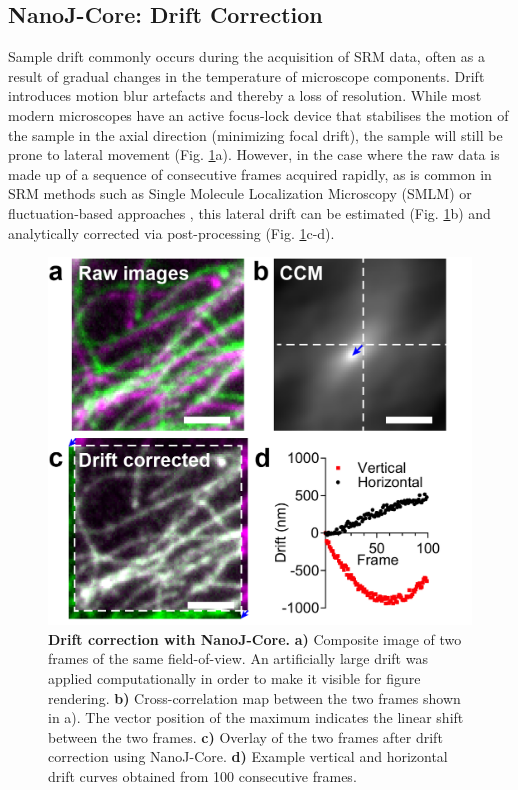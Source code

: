 \subsection*{NanoJ-Core: Drift Correction}
Sample drift commonly occurs during the acquisition of SRM data, often as a result of gradual changes in the temperature of microscope components. Drift introduces motion blur artefacts and thereby a loss of resolution. While most modern microscopes have an active focus-lock device that stabilises the motion of the sample in the axial direction (minimizing focal drift), the sample will still be prone to lateral movement (Fig. \ref{fig:DriftCorrection}a). However, in the case where the raw data is made up of a sequence of consecutive frames acquired rapidly, as is common in SRM methods such as Single Molecule Localization Microscopy (SMLM) \cite{betzig2006imaging,rust2006sub} or fluctuation-based approaches \cite{gustafsson2016fast,dertinger2009fast,cox2012bayesian}, this lateral drift can be estimated (Fig. \ref{fig:DriftCorrection}b) and analytically corrected via post-processing (Fig. \ref{fig:DriftCorrection}c-d).
 
 \begin{figure}[!t]
    \centering
    \includegraphics{Figures/FigureDrift_v2.png}
    \caption{\textbf{Drift correction with NanoJ-Core.} \textbf{a)} Composite image of two frames of the same field-of-view. An artificially large drift was applied computationally in order to make it visible for figure rendering. \textbf{b)} Cross-correlation map between the two frames shown in a). The vector position of the maximum indicates the linear shift between the two frames. \textbf{c)} Overlay of the two frames after drift correction using NanoJ-Core. \textbf{d)} Example vertical and horizontal drift curves obtained from 100 consecutive frames.}
    \label{fig:DriftCorrection}
 \end{figure}

